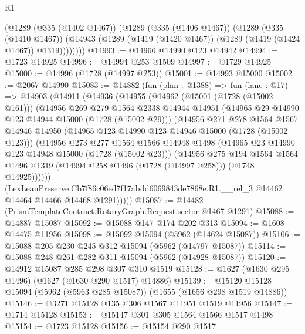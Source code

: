 \begin{lexlean}{R1}
\begin{coremodule}
        (@1289
          (@335 (@1402 @1467))
          (@1289
            (@335 (@1406 @1467))
            (@1289
              (@335 (@1410 @1467))
              (@14943 (@1289 (@1419 (@1420 @1467)) (@1289 (@1419 (@1424 @1467)) @1319))))))))
@14993 := @14966 @14990 @123 @14942
@14994 := @1723 @14925
@14996 := @14994 @253 @1509
@14997 := @1729 @14925
@15000 := @14996 (@1728 (@14997 @253))
@15001 := @14993 @15000
@15002 := @2067 @14990
@15083 := @14882
    (fun (plan : @1388) =>
    fun (lane : @17) =>
    @14903
      (@14911
        (@14936
          (@14955
            (@14962
              (@15001 (@1728 (@15002 @161)))
              (@14956
                @269
                @279
                @1564
                @2338
                @14944
                @14951
                (@14965 @29 @14990 @123 @14944 @15000 (@1728 (@15002 @29)))
                (@14956
                  @271
                  @278
                  @1564
                  @1567
                  @14946
                  @14950
                  (@14965 @123 @14990 @123 @14946 @15000 (@1728 (@15002 @123)))
                  (@14956
                    @273
                    @277
                    @1564
                    @1566
                    @14948
                    @1498
                    (@14965 @23 @14990 @123 @14948 @15000 (@1728 (@15002 @23)))
                    (@14956
                      @275
                      @194
                      @1564
                      @1564
                      @1496
                      @1319
                      (@14994 @258 @1496 (@1728 (@14997 @258)))
                      (@1748 @14925))))))
            (LexLeanPreserve.Cb7f86c06ed7f17abdd6069843de7868e.R1.__rel_3
              @14462
              @14464
              @14466
              @14468
              @1291)))))
@15087 := @14482 (PrismTemplateContract.RotaryGraph.Request.sector @1467 @1291)
@15088 := @14887 @15087
@15092 := @15088 @147 @174 @202 @313
@15094 := @1608 @14475 @11956
@15098 := @15092 @15094 (@5962 (@14624 @15087))
@15106 := @15088 @205 @230 @245 @312 @15094 (@5962 (@14797 @15087))
@15114 := @15088 @248 @261 @282 @311 @15094 (@5962 (@14928 @15087))
@15120 := @14912 @15087 @285 @298 @307 @310 @1519
@15128 := @1627 (@1630 @295 @1496) (@1627 (@1630 @290 @1517) @14886)
@15139 := @15120 @15128 @15094 (@5962 (@5963 @285 @15087)) (@1655 (@1656 @298 @1519 @14886))
@15146 := @3271 @15128 @135 @306 @1567 @11951 @1519 @11956
@15147 := @1714 @15128
@15153 := @15147 @301 @305 @1564 @1566 @1517 @1498
@15154 := @1723 @15128
@15156 := @15154 @290 @1517

\end{coremodule}
\end{lexlean}
